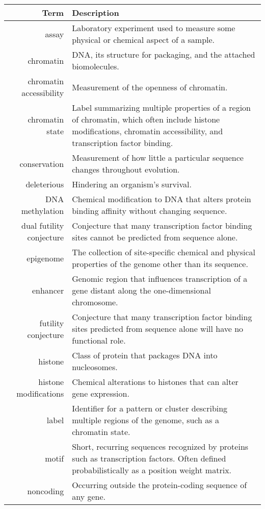 \documentclass[5p]{elsarticle}
\begin{document}
\begin{table*}[t]
  \centering
  \begin{tabular*}{\linewidth}{r@{\extracolsep{\fill}}p{}}
    \toprule
    \textbf{Term} & \textbf{Description} \\
    \midrule
    assay & Laboratory experiment used to measure some physical or chemical aspect of a sample. \\
    chromatin & DNA, its structure for packaging, and the attached biomolecules. \\
    chromatin accessibility & Measurement of the openness of chromatin. \\
    chromatin state & Label summarizing multiple properties of a region of chromatin, which often include histone modifications, chromatin accessibility, and transcription factor binding. \\
    conservation & Measurement of how little a particular sequence changes throughout evolution. \\
    deleterious & Hindering an organism's survival. \\
    DNA methylation & Chemical modification to DNA that alters protein binding affinity without changing sequence. \\
    dual futility conjecture & Conjecture that many transcription factor binding sites cannot be predicted from sequence alone. \\
    epigenome & The collection of site-specific chemical and physical properties of the genome other than its sequence. \\
    enhancer & Genomic region that influences transcription of a gene distant along the one-dimensional chromosome. \\
    futility conjecture & Conjecture that many transcription factor binding sites predicted from sequence alone will have no functional role. \\
    histone & Class of protein that packages DNA into nucleosomes. \\
    histone modifications & Chemical alterations to histones that can alter gene expression. \\
    label & Identifier for a pattern or cluster describing multiple regions of the genome, such as a chromatin state. \\
    motif & Short, recurring sequences recognized by proteins such as transcription factors.
            Often defined probabilistically as a position weight matrix. \\
    noncoding & Occurring outside the protein-coding sequence of any gene. \\

\end{tabular*}
\end{table*}
\end{document}
